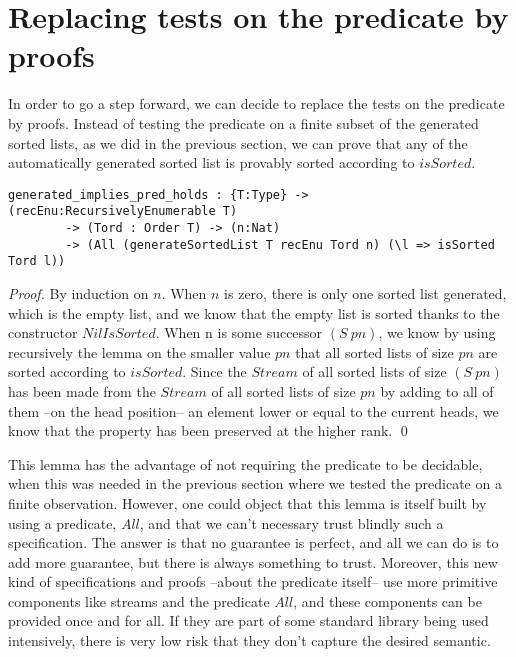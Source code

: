 \section{Replacing tests on the predicate by proofs}

\label{sect:aStepForward}

In order to go a step forward, we can decide to replace the tests on the predicate by proofs. Instead of testing the predicate on a finite subset of the generated sorted lists, as we did in the previous section, we can prove that any of the automatically generated sorted list is provably sorted according to $isSorted$.

\begin{lstlisting}
generated_implies_pred_holds : {T:Type} -> (recEnu:RecursivelyEnumerable T) 
        -> (Tord : Order T) -> (n:Nat) 
        -> (All (generateSortedList T recEnu Tord n) (\l => isSorted Tord l))
\end{lstlisting}
\begin{proof}
By induction on $n$.
When $n$ is zero, there is only one sorted list generated, which is the empty list, and we know that the empty list is sorted thanks to the constructor $NilIsSorted$. When n is some successor $(S\ pn)$, we know by using recursively the lemma on the smaller value $pn$ that all sorted lists of size $pn$ are sorted according to $isSorted$. Since the $Stream$ of all sorted lists of size $(S\ pn)$ has been made from the $Stream$ of all sorted lists of size $pn$ by adding to all of them --on the head position-- an element lower or equal to the current heads, we know that the property has been preserved at the higher rank.
\qed
\end{proof}

This lemma has the advantage of not requiring the predicate to be decidable, when this was needed in the previous section where we tested the predicate on a finite observation. However, one could object that this lemma is itself built by using a predicate, $All$, and that we can't necessary trust blindly such a specification. The answer is that no guarantee is perfect, and all we can do is to add more guarantee, but there is always something to trust. Moreover, this new kind of specifications and proofs --about the predicate itself-- use more primitive components like streams and the predicate $All$, and these components can be provided once and for all. If they are part of some standard library being used intensively, there is very low risk that they don't capture the desired semantic.

